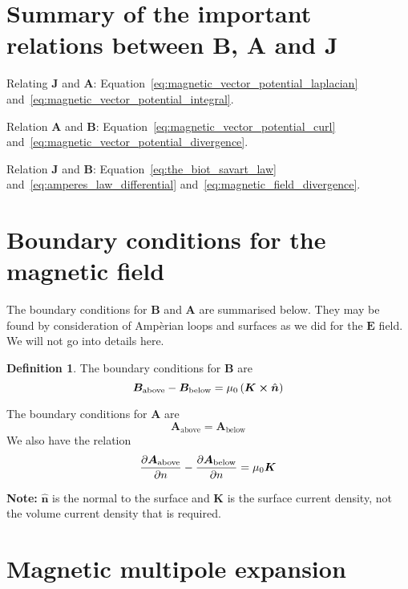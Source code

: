 \documentclass[12pt,chapterprefix=false,dvipsnames]{scrbook}
\theoremstyle{dotless}
\theoremstyle{definition}
\newtheorem{protodefinition}{Definition}[section]
\newenvironment{definition}
{\colorlet{shadecolor}{black!15}\begin{shaded}\begin{protodefinition}}
			{\end{protodefinition}\end{shaded}}
\begin{document}
\section{Summary of the important relations between B, A and J}%
\label{sec:summary_of_the_important_relations_between_b_a_and_j}

Relating $\bm{J}$ and $\bm{A}$:
Equation~\ref{eq:magnetic_vector_potential_laplacian} and~\ref{eq:magnetic_vector_potential_integral}.

Relation $\bm{A}$ and $\bm{B}$:
Equation~\ref{eq:magnetic_vector_potential_curl} and~\ref{eq:magnetic_vector_potential_divergence}.

Relation $\bm{J}$ and $\bm{B}$:
Equation~\ref{eq:the_biot_savart_law} and~\ref{eq:amperes_law_differential}
and~\ref{eq:magnetic_field_divergence}.

\section{Boundary conditions for the magnetic field}%
\label{sec:boundary_conditions_for_the_magnetic_field}

The boundary conditions for $\bm{B}$ and
$\bm{A}$ are summarised below. They may be found
by consideration of Ampèrian loops and surfaces as we did for
the $\bm{E}$ field. We will not go into details
here.
\begin{definition}
	The boundary conditions for $\bm{B}$ are
	\begin{equation}
		\bm{B}_{\mathrm{above}} -
		\bm{B}_{\mathrm{below}}
		=
		\mu_{0}\left(\bm{K}\cross\hat{\bm{n}}\right)
	\end{equation}

	The boundary conditions for $\bm{A}$ are
	\begin{equation}
		\bm{A}_{\mathrm{above}}
		=
		\bm{A}_{\mathrm{below}}
	\end{equation}
	We also have the relation
	\begin{equation}
		\pdv{\bm{A}_{\mathrm{above}}}{n} -
		\pdv{\bm{A}_{\mathrm{below}}}{n}
		=
		\mu_{0}\bm{K}
	\end{equation}
\end{definition}
\textbf{Note:} $\bm{\hat{n}}$ is the normal
to the surface and $\bm{K}$ is the surface
current density, not the volume current density that is
required.

\section{Magnetic multipole expansion}%
\label{sec:magnetic_multipole_expansion}
\end{document}

